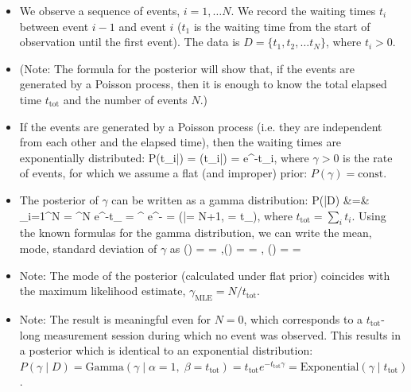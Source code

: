 \newpage
{}
\begin{itemize}
	\item We observe a sequence of events, $i = 1,\ldots N$. We record the waiting times $t_i$ between event $i-1$ and event $i$ ($t_1$ is the waiting time from the start of observation until the first event). The data is $D = \{t_1, t_2, \ldots t_N\}$, where $t_i > 0$.
	\item (Note: The formula for the posterior will show that, if the events are generated by a Poisson process, then it is enough to know the total elapsed time $t_\text{tot}$ and the number of events $N$.)
	\item If the events are generated by a Poisson process (i.e. they are independent from each other and the elapsed time), then the waiting times are exponentially distributed:
	\be
		P(t_i\;|\;\gamma) = (t_i\;|\;\gamma) = \gamma e^{-\gamma t_i},
	\ee
	where $\gamma > 0$ is the rate of events, for which we assume a flat (and improper) prior: $P(\gamma) = \text{const.}$
	\item The posterior of $\gamma$ can be written as a gamma distribution:
	\ba
		P(\gamma\;|\;D) &=&  \prod_{i=1}^N  =  \gamma^N e^{-\gamma t_} = \frac{\beta^\alpha}{\Gamma(\alpha)} \gamma^{} e^{-\beta\gamma} = (\gamma\;|\;\alpha = N+1, \beta = t_),
	\ea
	where $t_\text{tot} = \sum_i t_i$. Using the known formulas for the gamma distribution, we can write the mean, mode, standard deviation of $\gamma$ as 
	\be
		(\gamma) = \frac{\alpha}{\beta} = ,\quad {}(\gamma) =  = , \quad{}(\gamma) = \frac{\sqrt{\alpha}}{\beta} = 
	\ee
	\item Note: The mode of the posterior (calculated under flat prior) coincides with the maximum likelihood estimate, $\gamma_\text{MLE} = N / t_\text{tot}$.
	\item Note: The result is meaningful even for $N=0$, which corresponds to a $t_\text{tot}$-long measurement session during which no event was observed. This results in a posterior which is identical to an exponential distribution: $P(\gamma\;|\;D) = \text{Gamma}(\gamma\;|\;\alpha = 1, \;\beta = t_\text{tot}) = t_\text{tot} e^{-t_\text{tot} \gamma} = \text{Exponential}(\gamma\;|\;t_\text{tot})$.
\end{itemize}
\vspace{0.5cm}


